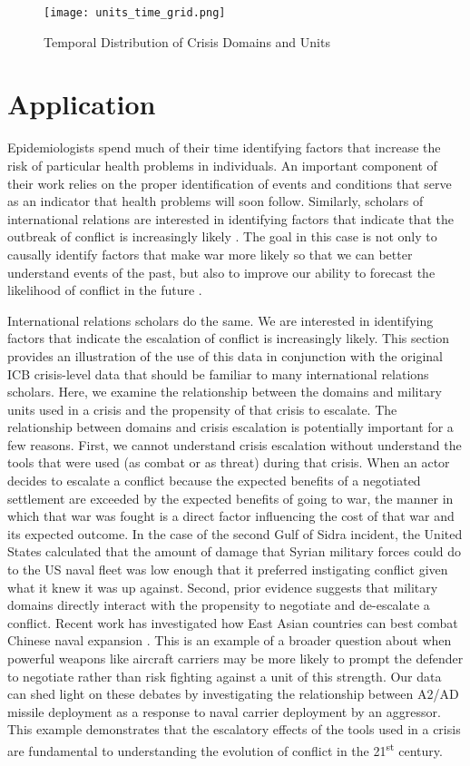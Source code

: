 \documentclass[12pt,letterpaper]{article}
\begin{document}
\begin{figure}[H]
	\centering
	\texttt{[image: units\_time\_grid.png]}
	\caption{Temporal Distribution of Crisis Domains and Units}
	\label{fig:summary_timeseries}
\end{figure}

\section{Application}
Epidemiologists spend much of their time identifying factors that increase the risk of particular health problems in individuals. An important component of their work relies on the proper identification of events and conditions that serve as an indicator that health problems will soon follow. Similarly, scholars of international relations are interested in identifying factors that indicate that the outbreak of conflict is increasingly likely \citep{senese_steps_2008}. The goal in this case is not only to causally identify factors that make war more likely so that we can better understand events of the past, but also to improve our ability to forecast the likelihood of conflict in the future \citep{valeriano_pathways_2010}.

International relations scholars do the same. We are interested in identifying factors that indicate the escalation of conflict is increasingly likely. This section provides an illustration of the use of this data in conjunction with the original ICB crisis-level data that should be familiar to many international relations scholars. Here, we examine the relationship between the domains and military units used in a crisis and the propensity of that crisis to escalate. The relationship between domains and crisis escalation is potentially important for a few reasons. First, we cannot understand crisis escalation without understand the tools that were used (as combat or as threat) during that crisis. When an actor decides to escalate a conflict because the expected benefits of a negotiated settlement are exceeded by the expected benefits of going to war, the manner in which that war was fought is a direct factor influencing the cost of that war and its expected outcome. In the case of the second Gulf of Sidra incident, the United States calculated that the amount of damage that Syrian military forces could do to the US naval fleet was low enough that it preferred instigating conflict given what it knew it was up against. Second, prior evidence suggests that military domains directly interact with the propensity to negotiate and de-escalate a conflict. Recent work has investigated how East Asian countries can best combat Chinese naval expansion \citep{beckley_emergingmilitarybalance_2017}. This is an example of a broader question about when powerful weapons like aircraft carriers may be more likely to prompt the defender to negotiate rather than risk fighting against a unit of this strength. Our data can shed light on these debates by investigating the relationship between A2/AD missile deployment as a response to naval carrier deployment by an aggressor. This example demonstrates that the escalatory effects of the tools used in a crisis are fundamental to understanding the evolution of conflict in the 21\textsuperscript{st} century.
\end{document}
